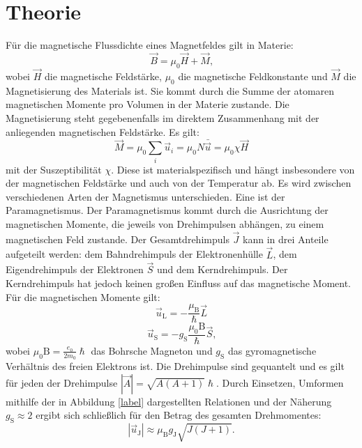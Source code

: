 
\section{Theorie}
\label{sec:Theorie}


Für die magnetische Flussdichte eines Magnetfeldes gilt in Materie:
\begin{equation}
\vec{B}=\mu_0 \vec{H}+\vec{M}\text{,}
\end{equation}
wobei $\vec{H}$ die magnetische Feldstärke, $\mu_0$ die magnetische Feldkonstante und $\vec{M}$ die Magnetisierung des Materials ist. Sie kommt durch die Summe der atomaren magnetischen Momente pro Volumen in der Materie zustande. Die Magnetisierung steht gegebenenfalls im direktem Zusammenhang mit der anliegenden magnetischen Feldstärke. Es gilt:
\begin{equation}
	\vec{M}=\mu_0 \sum_{i} \vec{u}_i = \mu_0 N \bar{\vec{u}} =\mu_0 \chi \vec{H}
\end{equation}
mit der Suszeptibilität $\chi$. Diese ist materialspezifisch und hängt insbesondere von der magnetischen Feldstärke und auch von der Temperatur ab. Es wird zwischen verschiedenen Arten der Magnetismus unterschieden. Eine ist der Paramagnetismus. Der Paramagnetismus kommt durch die Ausrichtung der magnetischen Momente, die jeweils von Drehimpulsen abhängen, zu einem magnetischen Feld zustande. Der Gesamtdrehimpuls $\vec{J}$ kann in drei Anteile aufgeteilt werden: dem Bahndrehimpuls der Elektronenhülle $\vec{L}$, dem Eigendrehimpuls der Elektronen $\vec{S}$ und dem Kerndrehimpuls. Der Kerndrehimpuls hat jedoch keinen großen Einfluss auf das magnetische Moment. Für die magnetischen Momente gilt:
\begin{equation}
	\vec{u}_\text{L}=-\frac{\mu_\text{B}}{\hslash} \vec{L}
\end{equation}
\begin{equation}
	\vec{u}_\text{S}=-g_\text{S} \frac{\mu_0\text{B}}{\hslash} \vec{S}\text{,}
\end{equation}
wobei $\mu_0\text{B}=\frac{e_0}{2 m_0} \hslash$ das Bohrsche Magneton und $g_\text{S}$ das gyromagnetische Verhältnis des freien Elektrons ist. Die Drehimpulse sind gequantelt und es gilt für jeden der Drehimpulse $|\vec{A}|= \sqrt{A(A+1)} \hslash$. Durch Einsetzen, Umformen mithilfe der in Abbildung \ref{label} dargestellten Relationen und der Näherung $g_\text{S}\approx 2$ ergibt sich schließlich für den Betrag des gesamten Drehmomentes:
\begin{equation}
	|\vec{u}_\text{J}|\approx \mu_\text{B} g_\text{J} \sqrt{J(J+1)} \text{.}
\end{equation}
